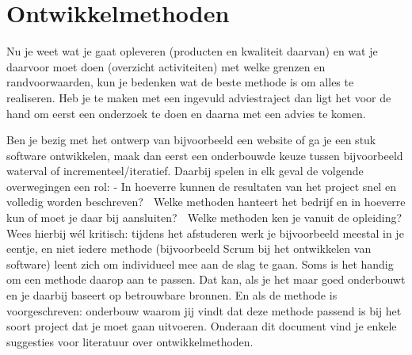 \chapter{Ontwikkelmethoden}
Nu je weet wat je gaat opleveren (producten en kwaliteit daarvan) en wat je daarvoor moet doen (overzicht activiteiten) met welke grenzen en randvoorwaarden, kun je bedenken wat de beste methode is om alles te realiseren. Heb je te maken met een ingevuld adviestraject dan ligt het voor de hand om eerst een onderzoek te doen en daarna met een advies te komen.

Ben je bezig met het ontwerp van bijvoorbeeld een website of ga je een stuk software ontwikkelen, maak dan eerst een onderbouwde keuze tussen bijvoorbeeld waterval of incrementeel/iteratief. Daarbij spelen in elk geval de volgende overwegingen een rol:
- In hoeverre kunnen de resultaten van het project snel en volledig worden beschreven?  Welke methoden hanteert het bedrijf en in hoeverre kun of moet je daar bij aansluiten?  Welke methoden ken je vanuit de opleiding?
Wees hierbij wél kritisch: tijdens het afstuderen werk je bijvoorbeeld meestal in je eentje, en niet iedere methode (bijvoorbeeld Scrum bij het ontwikkelen van software) leent zich om individueel mee aan de slag te gaan. Soms is het handig om een methode daarop aan te passen. Dat kan, als je het maar goed onderbouwt en je daarbij baseert op betrouwbare bronnen. En als de methode is voorgeschreven: onderbouw waarom jij vindt dat deze methode passend is bij het soort project dat je moet gaan uitvoeren. Onderaan dit document vind je enkele suggesties voor literatuur over ontwikkelmethoden.